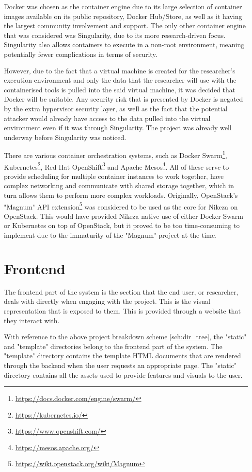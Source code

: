 Docker was chosen as the container engine due to its large selection of container images available on its public repository, Docker Hub/Store, as well as it having the largest community involvement and support. The only other container engine that was considered was Singularity, due to its more research-driven focus. Singularity also allows containers to execute in a non-root environment, meaning potentially fewer complications in terms of security. 

However, due to the fact that a virtual machine is created for the researcher's execution environment and only the data that the researcher will use with the containerised tools is pulled into the said virtual machine, it was decided that Docker will be suitable. Any security risk that is presented by Docker is negated by the extra hypervisor security layer, as well as the fact that the potential attacker would already have access to the data pulled into the virtual environment even if it was through Singularity. The project was already well underway before Singularity was noticed.

There are various container orchestration systems, such as Docker Swarm\footnote{\url{https://docs.docker.com/engine/swarm/}}, Kubernetes\footnote{\url{https://kubernetes.io/}}, Red Hat OpenShift\footnote{\url{https://www.openshift.com/}} and Apache Mesos\footnote{\url{https://mesos.apache.org/}}. All of these serve to provide scheduling for multiple container instances to work together, have complex networking and communicate with shared storage together, which in turn allows them to perform more complex workloads. Originally, OpenStack's "Magnum" API extension\footnote{\url{https://wiki.openstack.org/wiki/Magnum}} was considered to be used as the core for Nikeza on OpenStack. This would have provided Nikeza native use of either Docker Swarm or Kubernetes on top of OpenStack, but it proved to be too time-consuming to implement due to the immaturity of the "Magnum" project at the time.

\section{Frontend}

The frontend part of the system is the section that the end user, or researcher, deals with directly when engaging with the project. This is the visual representation that is exposed to them. This is provided through a website that they interact with.

With reference to the above project breakdown scheme \ref{sch:dir_tree}, the "static" and "template" directories belong to the frontend part of the system. The "template" directory contains the template HTML documents that are rendered through the backend when the user requests an appropriate page. The "static" directory contains all the assets used to provide features and visuals to the user.

